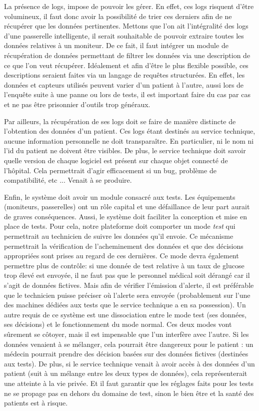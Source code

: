 La présence de logs, impose de pouvoir les gérer. En effet, ces logs risquent d'être volumineux, il faut donc avoir la
possibilité de trier ces derniers afin de ne récupérer que les données pertinentes. Mettons que l'on ait l'intégralité des logs
d'une passerelle intelligente, il serait souhaitable de pouvoir extraire toutes les données relatives à un moniteur. De ce fait,
il faut intégrer un module de récupération de données permettant de filtrer les données via une description de ce que l'on veut
récupérer. Idéalement et afin d'être le plus flexible possible, ces descriptions seraient faites via un langage de requêtes
structurées. En effet, les données et capteurs utilisés peuvent varier d'un patient à l'autre, aussi lors de l'enquête suite à une
panne ou lors de tests, il est important faire du cas par cas et ne pas être prisonnier d'outils trop généraux.
\newline

Par ailleurs, la récupération de ses logs doit se faire de manière distincte de l'obtention des données d'un patient. Ces logs
étant destinés au service technique, aucune information personnelle ne doit transparaître. En particulier, ni le nom ni l'id du
patient ne doivent être visibles. De plus, le service technique doit savoir quelle version de chaque logiciel est présent sur
chaque objet connecté de l'hôpital. Cela permettrait d'agir efficacement si un bug, problème de compatibilité, etc ... Venait à se
produire.
\newline

Enfin, le système doit avoir un module consacré aux tests. Les équipements (moniteurs, passerelles) ont un rôle capital et une
défaillance de leur part aurait de graves conséquences. Aussi, le système doit faciliter la conception et mise en place de tests.
Pour cela, notre plateforme doit comporter un mode \textit{test} qui permettrait au technicien de suivre les données qu'il envoie.
Ce mécanisme permettrait la vérification de l'acheminement des données et que des décisions appropriées sont prises au regard de
ces dernières. Ce mode devra également permettre plus de contrôle: si une donnée de test relative à un taux de glucose trop élevé
est envoyée, il ne faut pas que le personnel médical soit dérangé car il s'agit de données fictives. Mais afin de vérifier
l'émission d'alerte, il est préférable que le technicien puisse préciser où l'alerte sera envoyée (probablement sur l'une des
machines dédiées aux tests que le service technique a en sa possession). Un autre requis de ce système est une dissociation entre
le mode test (ses données, ses décisions) et le fonctionnement du mode normal. Ces deux modes vont sûrement se côtoyer, mais il
est impensable que l'un interfère avec l'autre. Si les données venaient à se mélanger, cela pourrait être dangereux pour le
patient : un médecin pourrait prendre des décision basées sur des données fictives (destinées aux tests). De plus, si le service
technique venait à avoir accès à des données d'un patient (suit à un mélange entre les deux types de données), cela
représenterait une atteinte à la vie privée. Et il faut garantir que les réglages faits pour les tests ne se propage pas en dehors
du domaine de test, sinon le bien être et la santé des patients est à risque.
\newline

